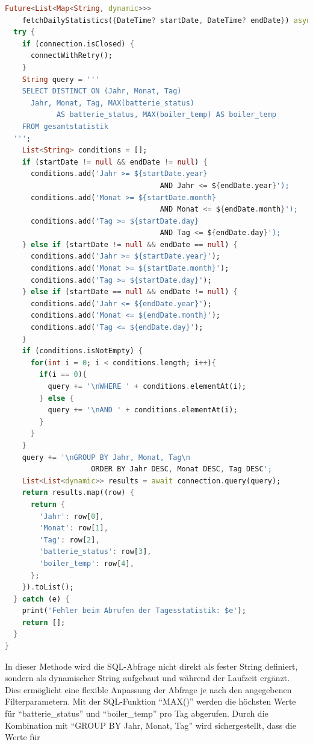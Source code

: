 \documentclass{article}
\begin{document}
    \begin{lstlisting}[language=Dart]
Future<List<Map<String, dynamic>>>
    fetchDailyStatistics({DateTime? startDate, DateTime? endDate}) async {
  try {
    if (connection.isClosed) {
      connectWithRetry();
    }
    String query = '''
    SELECT DISTINCT ON (Jahr, Monat, Tag)
      Jahr, Monat, Tag, MAX(batterie_status)
            AS batterie_status, MAX(boiler_temp) AS boiler_temp
    FROM gesamtstatistik
  ''';
    List<String> conditions = [];
    if (startDate != null && endDate != null) {
      conditions.add('Jahr >= ${startDate.year}
                                    AND Jahr <= ${endDate.year}');
      conditions.add('Monat >= ${startDate.month}
                                    AND Monat <= ${endDate.month}');
      conditions.add('Tag >= ${startDate.day}
                                    AND Tag <= ${endDate.day}');
    } else if (startDate != null && endDate == null) {
      conditions.add('Jahr >= ${startDate.year}');
      conditions.add('Monat >= ${startDate.month}');
      conditions.add('Tag >= ${startDate.day}');
    } else if (startDate == null && endDate != null) {
      conditions.add('Jahr <= ${endDate.year}');
      conditions.add('Monat <= ${endDate.month}');
      conditions.add('Tag <= ${endDate.day}');
    }
    if (conditions.isNotEmpty) {
      for(int i = 0; i < conditions.length; i++){
        if(i == 0){
          query += '\nWHERE ' + conditions.elementAt(i);
        } else {
          query += '\nAND ' + conditions.elementAt(i);
        }
      }
    }
    query += '\nGROUP BY Jahr, Monat, Tag\n
                    ORDER BY Jahr DESC, Monat DESC, Tag DESC';
    List<List<dynamic>> results = await connection.query(query);
    return results.map((row) {
      return {
        'Jahr': row[0],
        'Monat': row[1],
        'Tag': row[2],
        'batterie_status': row[3],
        'boiler_temp': row[4],
      };
    }).toList();
  } catch (e) {
    print('Fehler beim Abrufen der Tagesstatistik: $e');
    return [];
  }
}
    \end{lstlisting}
    In dieser Methode wird die SQL-Abfrage nicht direkt als fester String definiert, sondern als
    dynamischer String aufgebaut und während der Laufzeit ergänzt.
    Dies ermöglicht eine flexible Anpassung der Abfrage je nach den angegebenen Filterparametern.
    Mit der SQL-Funktion \enquote{MAX()} werden die höchsten Werte für \enquote{batterie\_status} und
    \enquote{boiler\_temp} pro Tag abgerufen.
    Durch die Kombination mit \enquote{GROUP BY Jahr, Monat, Tag} wird sichergestellt, dass die Werte für
\end{document}
